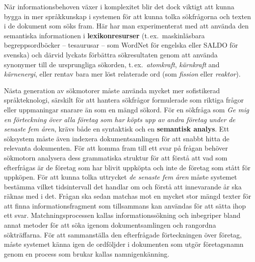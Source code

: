 \begin{multicols}{2}
När informationsbehoven växer i komplexitet blir det dock viktigt att
kunna bygga in mer språkkunskap i systemen för att kunna tolka
sökfrågorna och texten i de dokument som söks fram. Här har man
experimenterat med att använda den semantiska informationen i
\textbf{lexikonresurser} (t.\,ex.~maskinläsbara begreppsordböcker --
tesaurusar -- som WordNet för engelska eller SALDO för
svenska\cite{saldo1}) och därvid
lyckats förbättra sökresultaten genom att använda synonymer till de
ursprungliga sökorden, t.\,ex.~\textit{atomkraft}, \textit{kärnkraft}
and \textit{kärnenergi}, eller rentav bara mer löst relaterade ord
(som \textit{fission} eller \textit{reaktor}).


Nästa generation av sökmotorer måste använda mycket mer sofistikerad
språkteknologi, särskilt för att hantera sökfrågor formulerade som
riktiga frågor eller uppmaningar snarare än som en mängd sökord. För
en sökfråga som \textit{Ge mig en förteckning över alla företag som
  har köpts upp av andra företag under de senaste fem åren}, krävs
både en syntaktisk och en \textbf{semantisk analys}. Ett söksystem 
måste även indexera dokumentsamlingen för att snabbt hitta de
relevanta dokumenten. För att komma fram till ett svar på frågan
behöver sökmotorn analysera dess grammatiska struktur för att förstå
att vad som efterfrågas är de företag som har blivit uppköpta och inte
de företag som stått för uppköpen. För att kunna tolka uttrycket
\textit{de senaste fem åren} måste systemet bestämma vilket
tidsintervall det handlar om och förstå att innevarande år ska räknas
med i det. Frågan ska sedan matchas mot en mycket stor mängd texter
för att finna informationsfragment som tillsammans kan användas för
att sätta ihop ett svar. Matchnings\-pro\-cess\-en kallas
informationssökning och inbegriper bland annat metoder för att söka
igenom dokumentsam\-ling\-en och rangordna sökträffarna. För att
sammanställa den efterfrågade förteckningen över företag, måste
systemet känna igen de ordföljder i dokumenten som utgör företagsnamn
genom en process som brukar kallas namnigenkänning.


\end{multicols}
